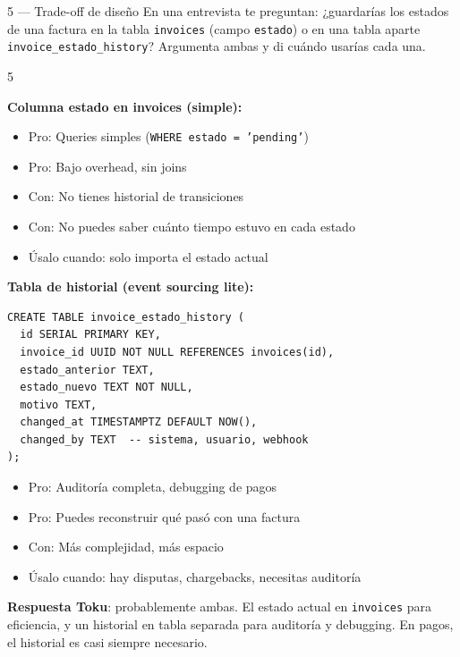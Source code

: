\documentclass[11pt,a4paper]{article}
\begin{document}
\begin{ejerciciobox}{5 — Trade-off de diseño}
En una entrevista te preguntan: ¿guardarías los estados de una factura en la tabla
\texttt{invoices} (campo \texttt{estado}) o en una tabla aparte
\texttt{invoice\_estado\_history}? Argumenta ambas y di cuándo usarías cada una.
\end{ejerciciobox}

\begin{solucionbox}{5}
\begin{tcolorbox}[colback=tipgreen!5,colframe=tipgreen!60]
\textbf{Columna estado en invoices (simple):}
\begin{itemize}
  \item Pro: Queries simples (\texttt{WHERE estado = 'pending'})
  \item Pro: Bajo overhead, sin joins
  \item Con: No tienes historial de transiciones
  \item Con: No puedes saber cuánto tiempo estuvo en cada estado
  \item Úsalo cuando: solo importa el estado actual
\end{itemize}

\textbf{Tabla de historial (event sourcing lite):}
\begin{lstlisting}[style=sql]
CREATE TABLE invoice_estado_history (
  id SERIAL PRIMARY KEY,
  invoice_id UUID NOT NULL REFERENCES invoices(id),
  estado_anterior TEXT,
  estado_nuevo TEXT NOT NULL,
  motivo TEXT,
  changed_at TIMESTAMPTZ DEFAULT NOW(),
  changed_by TEXT  -- sistema, usuario, webhook
);
\end{lstlisting}
\begin{itemize}
  \item Pro: Auditoría completa, debugging de pagos
  \item Pro: Puedes reconstruir qué pasó con una factura
  \item Con: Más complejidad, más espacio
  \item Úsalo cuando: hay disputas, chargebacks, necesitas auditoría
\end{itemize}

\textbf{Respuesta Toku}: probablemente ambas. El estado actual en
\texttt{invoices} para eficiencia, y un historial en tabla separada
para auditoría y debugging. En pagos, el historial es casi siempre necesario.
\end{tcolorbox}
\end{solucionbox}

\newpage
\end{document}
